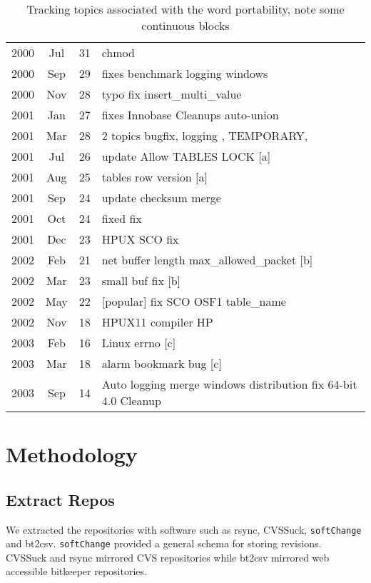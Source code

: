 \documentclass[times, 10pt,twocolumn]{article}
\begin{document}
\begin{table*}
\centering
\begin{tabular}{|ccc|l|}
\hline
2000 &  Jul &  31 &    chmod \\
2000 &  Sep &  29 &    fixes benchmark logging windows \\
2000 &  Nov &  28 &    typo fix insert\_multi\_value \\
2001 &  Jan &  27 &    fixes Innobase Cleanups auto-union \\
2001 &  Mar &  28 &    2 topics bugfix, logging , TEMPORARY,  \\
\hline
2001 &  Jul &  26 &    update Allow TABLES LOCK [a] \\ 

2001 &  Aug &  25 &    tables row version [a] \\
\hline
2001 &  Sep &  24 &    update checksum merge \\
2001 &  Oct &  24 &    fixed fix \\
2001 &  Dec &  23 &    HPUX SCO fix \\
\hline
2002 &  Feb &  21 &    net buffer length  max\_allowed\_packet [b] \\
2002 &  Mar &  23 &    small buf fix [b]  \\
\hline
2002 &  May &  22 &    [popular] fix SCO OSF1 table\_name \\
2002 &  Nov &  18 &    HPUX11 compiler HP \\
\hline
2003 &  Feb &  16 &    Linux errno  [c] \\
2003 &  Mar &  18 &    alarm bookmark bug [c] \\
\hline
2003 &  Sep &  14 &    Auto logging merge windows distribution fix 64-bit 4.0 Cleanup \\
\hline
\end{tabular}
\caption{Tracking topics associated with the word portability, note some continuous blocks}
\label{tab:portability}
\end{table*}




\section{Methodology}

\subsection{Extract Repos}

We extracted the repositories with software such as rsync, CVSSuck,
\texttt{softChange} and bt2csv.  \texttt{softChange} provided a
general schema for storing revisions. CVSSuck and rsync mirrored CVS
repositories while bt2csv mirrored web accessible bitkeeper
repositories.
\end{document}
